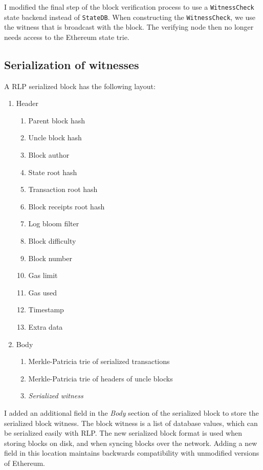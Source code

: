 \documentclass[12pt]{article}
\begin{document}
I modified the final step of the block verification process to use a \texttt{WitnessCheck} state backend instead of \texttt{StateDB}. When constructing the \texttt{WitnessCheck}, we use the witness that is broadcast with the block. The verifying node then no longer needs access to the Ethereum state trie.

\subsection{Serialization of witnesses}
A RLP serialized block has the following layout:
\begin{enumerate}
  \item Header
  \begin{enumerate}
    \item Parent block hash
    \item Uncle block hash
    \item Block author
    \item State root hash
    \item Transaction root hash
    \item Block receipts root hash
    \item Log bloom filter
    \item Block difficulty
    \item Block number
    \item Gas limit
    \item Gas used
    \item Timestamp
    \item Extra data
  \end{enumerate}
  \item Body
  \begin{enumerate}
    \item Merkle-Patricia trie of serialized transactions
    \item Merkle-Patricia trie of headers of uncle blocks
    \item \emph{Serialized witness}
  \end{enumerate}
\end{enumerate}

I added an additional field in the \emph{Body} section of the serialized block to store the serialized block witness. The block witness is a list of database values, which can be serialized easily with RLP. The new serialized block format is used when storing blocks on disk, and when syncing blocks over the network. Adding a new field in this location maintains backwards compatibility with unmodified versions of Ethereum.
\end{document}
